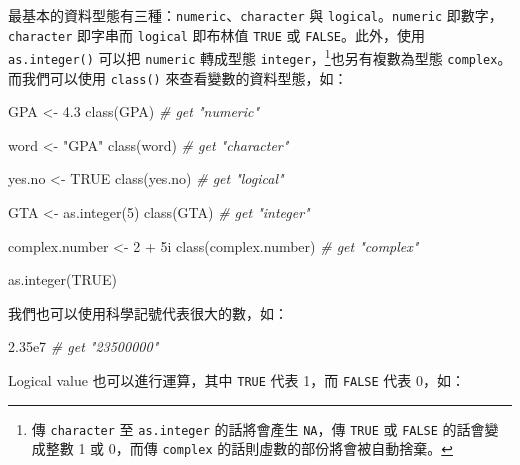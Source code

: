 \documentclass[
]{book}
\newenvironment{Shaded}{\begin{snugshade}}{\end{snugshade}}
\newcommand{\CommentTok}[1]{\textcolor[rgb]{0.56,0.35,0.01}{\textit{#1}}}
\newcommand{\ConstantTok}[1]{\textcolor[rgb]{0.00,0.00,0.00}{#1}}
\newcommand{\DecValTok}[1]{\textcolor[rgb]{0.00,0.00,0.81}{#1}}
\newcommand{\FloatTok}[1]{\textcolor[rgb]{0.00,0.00,0.81}{#1}}
\newcommand{\FunctionTok}[1]{\textcolor[rgb]{0.00,0.00,0.00}{#1}}
\newcommand{\NormalTok}[1]{#1}
\newcommand{\OtherTok}[1]{\textcolor[rgb]{0.56,0.35,0.01}{#1}}
\newcommand{\SpecialCharTok}[1]{\textcolor[rgb]{0.00,0.00,0.00}{#1}}
\newcommand{\StringTok}[1]{\textcolor[rgb]{0.31,0.60,0.02}{#1}}
\let\oldfootnote\footnote
\renewcommand\footnote[1]{\oldfootnote{%
\renewcommand\baselinestretch{1.1}%
\large\footnotesize\ignorespaces#1}}
\theoremstyle{definition}
\theoremstyle{remark}
\begin{document}
最基本的資料型態有三種：\texttt{numeric}、\texttt{character} 與 \texttt{logical}。\texttt{numeric} 即數字，\texttt{character} 即字串而 \texttt{logical} 即布林值 \texttt{TRUE} 或 \texttt{FALSE}。此外，使用 \texttt{as.integer()} 可以把 \texttt{numeric} 轉成型態 \texttt{integer}，\footnote{傳 \texttt{character} 至 \texttt{as.integer} 的話將會產生 \texttt{NA}，傳 \texttt{TRUE} 或 \texttt{FALSE} 的話會變成整數 1 或 0，而傳 \texttt{complex} 的話則虛數的部份將會被自動捨棄。}也另有複數為型態 \texttt{complex}。而我們可以使用 \texttt{class()} 來查看變數的資料型態，如：

\begin{Shaded}
\begin{Highlighting}[]
\NormalTok{GPA }\OtherTok{\textless{}{-}} \FloatTok{4.3}
\FunctionTok{class}\NormalTok{(GPA)  }\CommentTok{\# get "\textquotesingle{}numeric\textquotesingle{}"}

\NormalTok{word }\OtherTok{\textless{}{-}} \StringTok{"GPA"}
\FunctionTok{class}\NormalTok{(word)  }\CommentTok{\# get "\textquotesingle{}character\textquotesingle{}"}

\NormalTok{yes.no }\OtherTok{\textless{}{-}} \ConstantTok{TRUE}
\FunctionTok{class}\NormalTok{(yes.no)  }\CommentTok{\# get "\textquotesingle{}logical\textquotesingle{}"}

\NormalTok{GTA }\OtherTok{\textless{}{-}} \FunctionTok{as.integer}\NormalTok{(}\DecValTok{5}\NormalTok{)}
\FunctionTok{class}\NormalTok{(GTA)  }\CommentTok{\# get "\textquotesingle{}integer\textquotesingle{}"}

\NormalTok{complex.number }\OtherTok{\textless{}{-}} \DecValTok{2} \SpecialCharTok{+}\NormalTok{ 5i}
\FunctionTok{class}\NormalTok{(complex.number)  }\CommentTok{\# get "\textquotesingle{}complex\textquotesingle{}"}

\FunctionTok{as.integer}\NormalTok{(}\ConstantTok{TRUE}\NormalTok{)}
\end{Highlighting}
\end{Shaded}

我們也可以使用科學記號代表很大的數，如：

\begin{Shaded}
\begin{Highlighting}[]
\FloatTok{2.35e7}  \CommentTok{\# get "23500000"}
\end{Highlighting}
\end{Shaded}

Logical value 也可以進行運算，其中 \texttt{TRUE} 代表 1，而 \texttt{FALSE} 代表 0，如：
\end{document}

